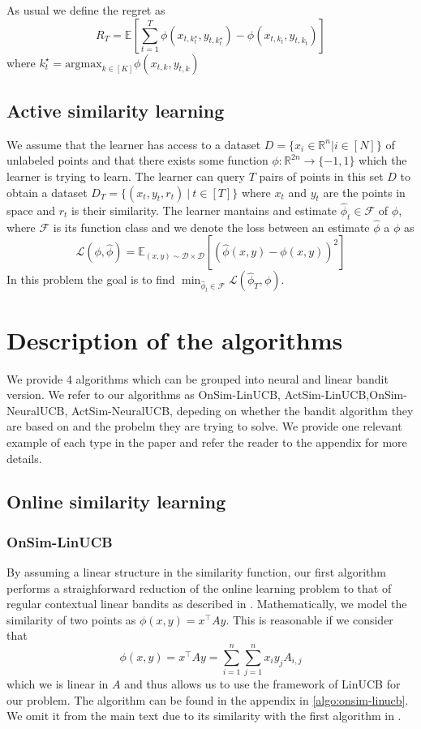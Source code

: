\documentclass{article}
\begin{document}
As usual we define the regret as
\[ R_T = \mathbb{E}\left[\sum_{t =1}^T \phi(x_{t,k^\star_t}, y_{t,k^\star_t}) - \phi(x_{t,k_t}, y_{t,k_t})\right]\]
where $k_t^\star = \text{argmax}_{k\in [K]} \phi(x_{t,k}, y_{t,k})$

\subsection{Active similarity learning}
\label{problem-statement:active-similarity-learning}
We assume that the learner has access to a dataset $D = \{x_i \in \mathbb{R}^n| i \in [N]\}$ of unlabeled points and that there exists some function $\phi: \mathbb{R}^{2n} \to \{-1, 1\}$ which the learner is trying to learn.
The learner can query $T$ pairs of points in this set $D$ to obtain a dataset $D_T = \{(x_t, y_t, r_t) ~|  ~t \in [T]\}$  where $x_t$ and $y_t$ are the points in space and $r_t$ is their similarity.
The learner mantains and estimate $\hat{\phi}_t \in \mathcal{F}$ of $\phi$, where $\mathcal{F}$ is its function class and we denote the loss between an estimate $\hat{\phi}$ a $\phi$ as
\[ \mathcal{L}(\phi, \hat{\phi}) = \mathbb{E}_{(x, y) \sim \mathcal{D} \times \mathcal{D}}[(\hat{\phi}(x,y) - \phi(x, y))^2] \]
In this problem the goal is to find $\min_{\hat{\phi}_t \in \mathcal{F}} \mathcal{L}(\hat{\phi}_T, \phi)$.


\section{Description of the algorithms}
We provide 4 algorithms  which can be grouped into neural and linear bandit version. We refer to our algorithms as OnSim-LinUCB, ActSim-LinUCB,OnSim-NeuralUCB, ActSim-NeuralUCB, depeding on whether the bandit algorithm they are based on and the probelm
they are trying to solve. We provide one relevant example of each type in the paper and refer the reader to the appendix for more details.


\subsection{Online similarity learning}
\subsubsection{OnSim-LinUCB}
By assuming a linear structure in the similarity function, our first algorithm performs a straighforward reduction of the online learning problem to that of regular contextual linear bandits as described in \cite{linucb}.
Mathematically, we model the similarity of two points as  $\phi(x, y) = x^\top A y$.
This is reasonable if we consider that
\[\phi(x, y) = x^\top A y = \sum_{i =1}^n\sum_{j=1}^n x_i y_j A_{i,j} \]
which we is linear in $A$ and thus allows us to use the framework of LinUCB for our problem.
The algorithm can be found in the appendix in \ref{algo:onsim-linucb}. We omit it from the main text due to its similarity with the first algorithm in \cite{linucb}.
\end{document}
